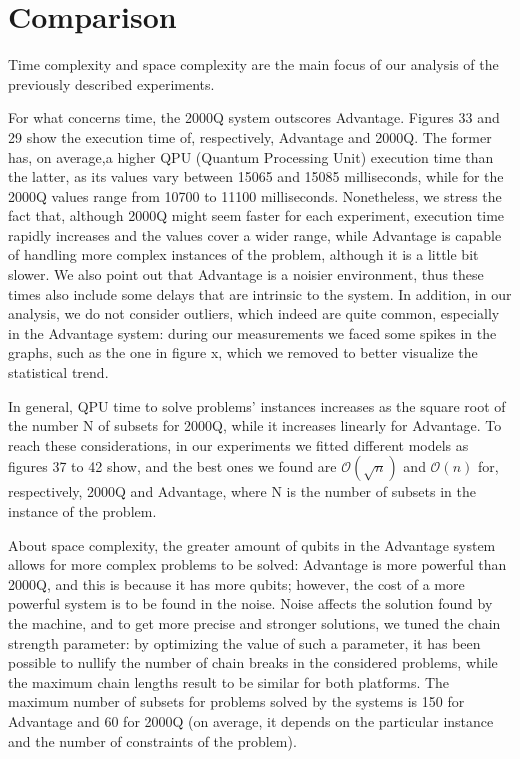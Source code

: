 \documentclass[oneside,a4paper]{article}
\begin{document}
\section{Comparison}

Time complexity and space complexity are the main focus of our analysis of the previously described experiments. 


For what concerns time, the 2000Q system outscores Advantage. Figures 33 and 29 show the execution time of, respectively, Advantage and 2000Q. The former has, on average,a higher QPU (Quantum Processing Unit) execution time than the latter, as its values vary between 15065 and 15085 milliseconds, while for the 2000Q values range from 10700 to 11100 milliseconds. Nonetheless, we stress the fact that, although 2000Q might seem faster for each experiment, execution time rapidly increases and the values cover a wider range, while Advantage is capable of handling more complex instances of the problem, although it is a little bit slower. We also point out that Advantage is a noisier environment, thus these times also include some delays that are intrinsic to the system. In addition, in our analysis, we do not consider outliers, which indeed are quite common, especially in the Advantage system: during our measurements we faced some spikes in the graphs, such as the one in figure x, which we removed to better visualize the statistical trend.

In general, QPU time to solve problems’ instances increases as the square root of the number N of subsets for 2000Q, while it increases linearly for Advantage. To reach these considerations, in our experiments we fitted different models as figures 37 to 42 show, and the best ones we found are
$\mathcal{O}(\sqrt{n})$ and $\mathcal{O}(n)$ for, respectively, 2000Q and Advantage, where N is the number of subsets in the instance of the problem.

About space complexity, the greater amount of qubits in the Advantage system allows for more complex problems to be solved: Advantage is more powerful than 2000Q, and this is because it has more qubits; however, the cost of a more powerful system is to be found in the noise. Noise affects the solution found by the machine, and to get more precise and stronger solutions, we tuned the chain strength parameter: by optimizing the value of such a parameter, it has been possible to nullify the number of chain breaks in the considered problems, while the maximum chain lengths result to be similar for both platforms. The maximum number of subsets for problems solved by the systems is 150 for Advantage and 60 for 2000Q (on average, it depends on the particular instance and the number of constraints of the problem).
\end{document}
